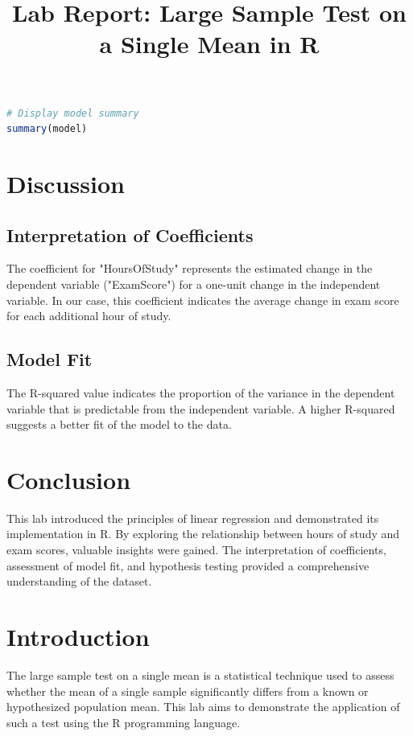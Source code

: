 \documentclass[10pt]{book}
\begin{document}
\begin{lstlisting}[language=R]
# Display model summary
summary(model)
\end{lstlisting}

\section{Discussion}

\subsection{Interpretation of Coefficients}

The coefficient for "HoursOfStudy" represents the estimated change in the dependent variable ("ExamScore") for a one-unit change in the independent variable. In our case, this coefficient indicates the average change in exam score for each additional hour of study.

\subsection{Model Fit}

The R-squared value indicates the proportion of the variance in the dependent variable that is predictable from the independent variable. A higher R-squared suggests a better fit of the model to the data.

\section{Conclusion}

This lab introduced the principles of linear regression and demonstrated its implementation in R. By exploring the relationship between hours of study and exam scores, valuable insights were gained. The interpretation of coefficients, assessment of model fit, and hypothesis testing provided a comprehensive understanding of the dataset.


\newpage



\title{Lab Report: Large Sample Test on a Single Mean in R}
\section{Introduction}

The large sample test on a single mean is a statistical technique used to assess whether the mean of a single sample significantly differs from a known or hypothesized population mean. This lab aims to demonstrate the application of such a test using the R programming language.
\end{document}
